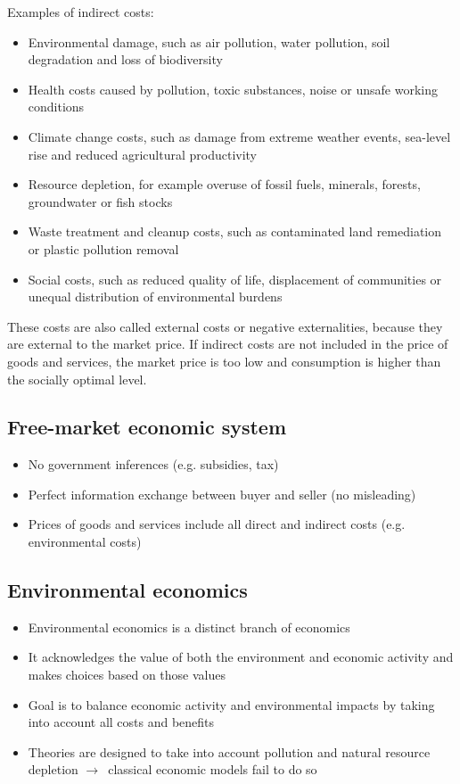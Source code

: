 \documentclass{article}
\begin{document}
Examples of indirect costs:
\begin{itemize}
    \item Environmental damage, such as air pollution, water pollution, soil degradation and loss of biodiversity
    \item Health costs caused by pollution, toxic substances, noise or unsafe working conditions
    \item Climate change costs, such as damage from extreme weather events, sea-level rise and reduced agricultural productivity
    \item Resource depletion, for example overuse of fossil fuels, minerals, forests, groundwater or fish stocks
    \item Waste treatment and cleanup costs, such as contaminated land remediation or plastic pollution removal
    \item Social costs, such as reduced quality of life, displacement of communities or unequal distribution of environmental burdens
\end{itemize}

These costs are also called external costs or negative externalities,
because they are external to the market price. If indirect costs are
not included in the price of goods and services, the market price is
too low and consumption is higher than the socially optimal level.

\subsection{Free-market economic system}
\begin{itemize}
    \item No government inferences (e.g. subsidies, tax)
    \item Perfect information exchange between buyer and seller (no misleading)
    \item Prices of goods and services include all direct and indirect costs (e.g. environmental costs)
\end{itemize}

\subsection{Environmental economics}
\begin{itemize}
    \item Environmental economics is a distinct branch of economics
    \item It acknowledges the value of both the environment and economic activity and makes choices based on those values
    \item Goal is to balance economic activity and environmental impacts by taking into account all costs and benefits
    \item Theories are designed to take into account pollution and natural resource depletion $\to$\ classical economic models fail to do so
\end{itemize}
\end{document}
